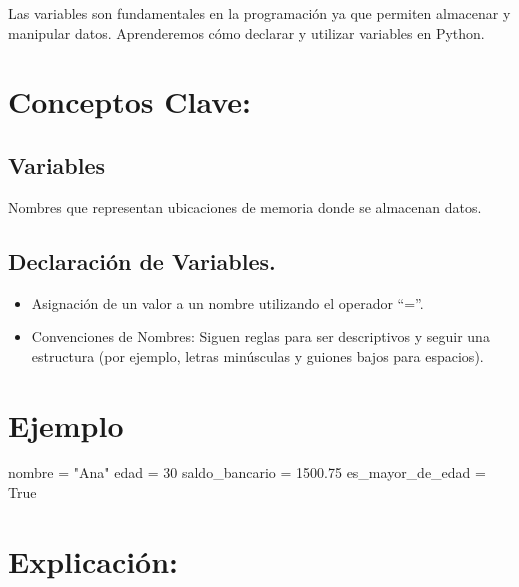 \documentclass[
  a4paper,
  onepage,
  openany]{scrreprt}
\newenvironment{Shaded}{\begin{snugshade}}{\end{snugshade}}
\newcommand{\DecValTok}[1]{\textcolor[rgb]{0.68,0.00,0.00}{#1}}
\newcommand{\FloatTok}[1]{\textcolor[rgb]{0.68,0.00,0.00}{#1}}
\newcommand{\NormalTok}[1]{\textcolor[rgb]{0.00,0.23,0.31}{#1}}
\newcommand{\OperatorTok}[1]{\textcolor[rgb]{0.37,0.37,0.37}{#1}}
\newcommand{\StringTok}[1]{\textcolor[rgb]{0.13,0.47,0.30}{#1}}
\newcommand{\VariableTok}[1]{\textcolor[rgb]{0.07,0.07,0.07}{#1}}
\providecommand{\tightlist}{%
  \setlength{\itemsep}{0pt}\setlength{\parskip}{0pt}}\usepackage{longtable,booktabs,array}
\begin{document}
Las variables son fundamentales en la programación ya que permiten
almacenar y manipular datos. Aprenderemos cómo declarar y utilizar
variables en Python.

\hypertarget{conceptos-clave-11}{%
\section{Conceptos Clave:}\label{conceptos-clave-11}}

\hypertarget{variables-5}{%
\subsection{Variables}\label{variables-5}}

Nombres que representan ubicaciones de memoria donde se almacenan datos.

\hypertarget{declaraciuxf3n-de-variables.-1}{%
\subsection{Declaración de
Variables.}\label{declaraciuxf3n-de-variables.-1}}

\begin{itemize}
\tightlist
\item
  Asignación de un valor a un nombre utilizando el operador ``=''.
\item
  Convenciones de Nombres: Siguen reglas para ser descriptivos y seguir
  una estructura (por ejemplo, letras minúsculas y guiones bajos para
  espacios).
\end{itemize}

\hypertarget{ejemplo-11}{%
\section{Ejemplo}\label{ejemplo-11}}

\begin{Shaded}
\begin{Highlighting}[]
\NormalTok{nombre }\OperatorTok{=} \StringTok{"Ana"}
\NormalTok{edad }\OperatorTok{=} \DecValTok{30}
\NormalTok{saldo\_bancario }\OperatorTok{=} \FloatTok{1500.75}
\NormalTok{es\_mayor\_de\_edad }\OperatorTok{=} \VariableTok{True}
\end{Highlighting}
\end{Shaded}

\hypertarget{explicaciuxf3n-11}{%
\section{Explicación:}\label{explicaciuxf3n-11}}
\end{document}
